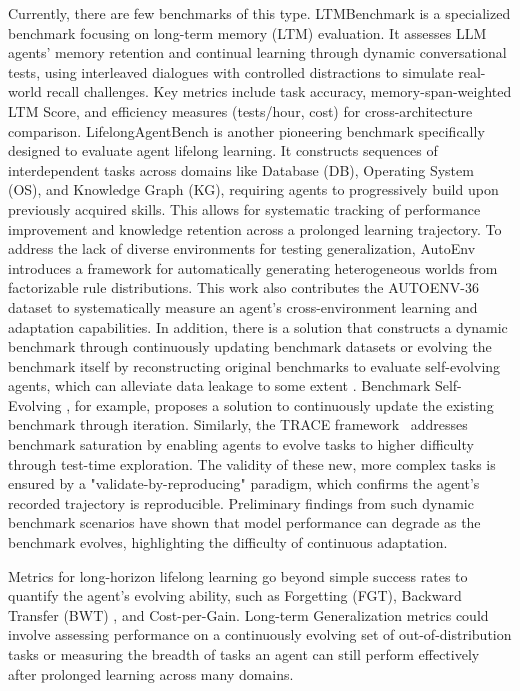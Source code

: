 \documentclass[10pt]{article} %
\begin{document}
Currently, there are few benchmarks of this type. 
LTMBenchmark \citep{castillo-bolado2024beyond} is a specialized benchmark focusing on long-term memory (LTM) evaluation. It assesses LLM agents' memory retention and continual learning through dynamic conversational tests, using interleaved dialogues with controlled distractions to simulate real-world recall challenges. Key metrics include task accuracy, memory-span-weighted LTM Score, and efficiency measures (tests/hour, cost) for cross-architecture comparison.
LifelongAgentBench \citep{zheng2025lifelongagentbench} is another pioneering benchmark specifically designed to evaluate agent lifelong learning. It constructs sequences of interdependent tasks across domains like Database (DB), Operating System (OS), and Knowledge Graph (KG), requiring agents to progressively build upon previously acquired skills. This allows for systematic tracking of performance improvement and knowledge retention across a prolonged learning trajectory. To address the lack of diverse environments for testing generalization, AutoEnv~\citep{zhang2025autoenv} introduces a framework for automatically generating heterogeneous worlds from factorizable rule distributions. This work also contributes the AUTOENV-36 dataset to systematically measure an agent's cross-environment learning and adaptation capabilities.
In addition, there is a solution that constructs a dynamic benchmark through continuously updating benchmark datasets \citep{white2024livebench, yang2025truly} or evolving the benchmark itself by reconstructing original benchmarks to evaluate self-evolving agents, which can alleviate data leakage to some extent \citep{chen2025recent}. Benchmark Self-Evolving \citep{wang2024benchmark}, for example, proposes a solution to continuously update the existing benchmark through iteration. Similarly, the TRACE framework~\citep{guo2025selfevolvingbenchmark} addresses benchmark saturation by enabling agents to evolve tasks to higher difficulty through test-time exploration. The validity of these new, more complex tasks is ensured by a "validate-by-reproducing" paradigm, which confirms the agent's recorded trajectory is reproducible.
Preliminary findings from such dynamic benchmark scenarios have shown that model performance can degrade as the benchmark evolves, highlighting the difficulty of continuous adaptation.

Metrics for long-horizon lifelong learning go beyond simple success rates to quantify the agent's evolving ability, such as Forgetting (FGT), Backward Transfer (BWT) \citep{zheng2025lifelong}, and Cost-per-Gain. Long-term Generalization metrics could involve assessing performance on a continuously evolving set of out-of-distribution tasks or measuring the breadth of tasks an agent can still perform effectively after prolonged learning across many domains.
\end{document}
